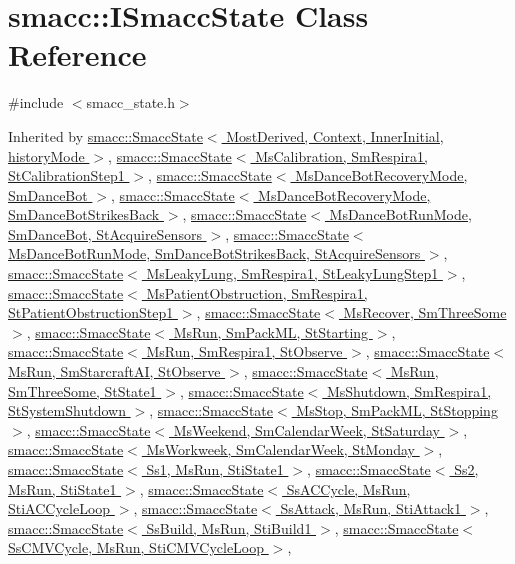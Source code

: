 \hypertarget{classsmacc_1_1ISmaccState}{}\section{smacc\+:\+:I\+Smacc\+State Class Reference}
\label{classsmacc_1_1ISmaccState}


{\ttfamily \#include $<$smacc\+\_\+state.\+h$>$}



Inherited by \hyperlink{classsmacc_1_1SmaccState}{smacc\+::\+Smacc\+State$<$ Most\+Derived, Context, Inner\+Initial, history\+Mode $>$}, \hyperlink{classsmacc_1_1SmaccState}{smacc\+::\+Smacc\+State$<$ Ms\+Calibration, Sm\+Respira1, St\+Calibration\+Step1 $>$}, \hyperlink{classsmacc_1_1SmaccState}{smacc\+::\+Smacc\+State$<$ Ms\+Dance\+Bot\+Recovery\+Mode, Sm\+Dance\+Bot $>$}, \hyperlink{classsmacc_1_1SmaccState}{smacc\+::\+Smacc\+State$<$ Ms\+Dance\+Bot\+Recovery\+Mode, Sm\+Dance\+Bot\+Strikes\+Back $>$}, \hyperlink{classsmacc_1_1SmaccState}{smacc\+::\+Smacc\+State$<$ Ms\+Dance\+Bot\+Run\+Mode, Sm\+Dance\+Bot, St\+Acquire\+Sensors $>$}, \hyperlink{classsmacc_1_1SmaccState}{smacc\+::\+Smacc\+State$<$ Ms\+Dance\+Bot\+Run\+Mode, Sm\+Dance\+Bot\+Strikes\+Back, St\+Acquire\+Sensors $>$}, \hyperlink{classsmacc_1_1SmaccState}{smacc\+::\+Smacc\+State$<$ Ms\+Leaky\+Lung, Sm\+Respira1, St\+Leaky\+Lung\+Step1 $>$}, \hyperlink{classsmacc_1_1SmaccState}{smacc\+::\+Smacc\+State$<$ Ms\+Patient\+Obstruction, Sm\+Respira1, St\+Patient\+Obstruction\+Step1 $>$}, \hyperlink{classsmacc_1_1SmaccState}{smacc\+::\+Smacc\+State$<$ Ms\+Recover, Sm\+Three\+Some $>$}, \hyperlink{classsmacc_1_1SmaccState}{smacc\+::\+Smacc\+State$<$ Ms\+Run, Sm\+Pack\+M\+L, St\+Starting $>$}, \hyperlink{classsmacc_1_1SmaccState}{smacc\+::\+Smacc\+State$<$ Ms\+Run, Sm\+Respira1, St\+Observe $>$}, \hyperlink{classsmacc_1_1SmaccState}{smacc\+::\+Smacc\+State$<$ Ms\+Run, Sm\+Starcraft\+A\+I, St\+Observe $>$}, \hyperlink{classsmacc_1_1SmaccState}{smacc\+::\+Smacc\+State$<$ Ms\+Run, Sm\+Three\+Some, St\+State1 $>$}, \hyperlink{classsmacc_1_1SmaccState}{smacc\+::\+Smacc\+State$<$ Ms\+Shutdown, Sm\+Respira1, St\+System\+Shutdown $>$}, \hyperlink{classsmacc_1_1SmaccState}{smacc\+::\+Smacc\+State$<$ Ms\+Stop, Sm\+Pack\+M\+L, St\+Stopping $>$}, \hyperlink{classsmacc_1_1SmaccState}{smacc\+::\+Smacc\+State$<$ Ms\+Weekend, Sm\+Calendar\+Week, St\+Saturday $>$}, \hyperlink{classsmacc_1_1SmaccState}{smacc\+::\+Smacc\+State$<$ Ms\+Workweek, Sm\+Calendar\+Week, St\+Monday $>$}, \hyperlink{classsmacc_1_1SmaccState}{smacc\+::\+Smacc\+State$<$ Ss1, Ms\+Run, Sti\+State1 $>$}, \hyperlink{classsmacc_1_1SmaccState}{smacc\+::\+Smacc\+State$<$ Ss2, Ms\+Run, Sti\+State1 $>$}, \hyperlink{classsmacc_1_1SmaccState}{smacc\+::\+Smacc\+State$<$ Ss\+A\+C\+Cycle, Ms\+Run, Sti\+A\+C\+Cycle\+Loop $>$}, \hyperlink{classsmacc_1_1SmaccState}{smacc\+::\+Smacc\+State$<$ Ss\+Attack, Ms\+Run, Sti\+Attack1 $>$}, \hyperlink{classsmacc_1_1SmaccState}{smacc\+::\+Smacc\+State$<$ Ss\+Build, Ms\+Run, Sti\+Build1 $>$}, \hyperlink{classsmacc_1_1SmaccState}{smacc\+::\+Smacc\+State$<$ Ss\+C\+M\+V\+Cycle, Ms\+Run, Sti\+C\+M\+V\+Cycle\+Loop $>$}, 